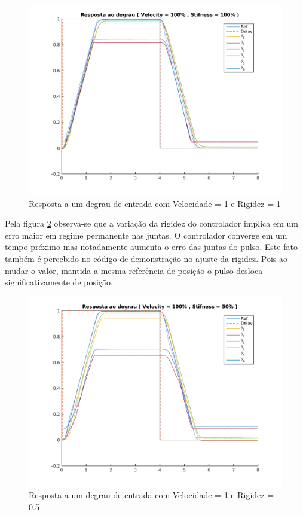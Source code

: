\begin{figure}[H]
    \centering
    \includegraphics[width=0.8\linewidth]{tex/figs/jointIdentification_exp1v100v100.png}
    \caption{Resposta a um degrau de entrada com Velocidade = 1 e Rigidez = 1}
    \label{fig:jointIdentification_exp1v100v100}
\end{figure}

Pela figura \ref{fig:jointIdentification_exp2v100v50} observa-se que a variação da rigidez do controlador implica em um erro maior em regime permanente nas juntas. O controlador converge em um tempo próximo mas notadamente aumenta o erro das juntas do pulso. Este fato também é percebido no código de demonstração no ajuste da rigidez. Pois ao mudar o valor, mantida a mesma referência de posição o pulso desloca significativamente de posição.

\begin{figure}[H]
    \centering
    \includegraphics[width=0.8\linewidth]{tex/figs/jointIdentification_exp2v100v50.png}
    \caption{Resposta a um degrau de entrada com Velocidade = 1 e Rigidez = 0.5}
    \label{fig:jointIdentification_exp2v100v50}
\end{figure}

